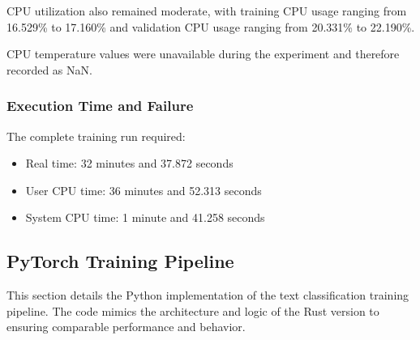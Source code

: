 \documentclass[10pt,a4paper,twocolumn]{article}
\begin{document}
CPU utilization also remained moderate, with training CPU usage ranging from 16.529\% to 17.160\% and validation CPU usage ranging from 20.331\% to 22.190\%.

CPU temperature values were unavailable during the experiment and therefore recorded as NaN.

\subsubsection{Execution Time and Failure}

The complete training run required:

\begin{itemize}
    \item Real time: 32 minutes and 37.872 seconds
    \item User CPU time: 36 minutes and 52.313 seconds
    \item System CPU time: 1 minute and 41.258 seconds
\end{itemize}

\subsection{PyTorch Training Pipeline}
This section details the Python implementation of the text classification training pipeline. The code mimics the architecture and logic of the Rust version to ensuring comparable performance and behavior.
\end{document}
